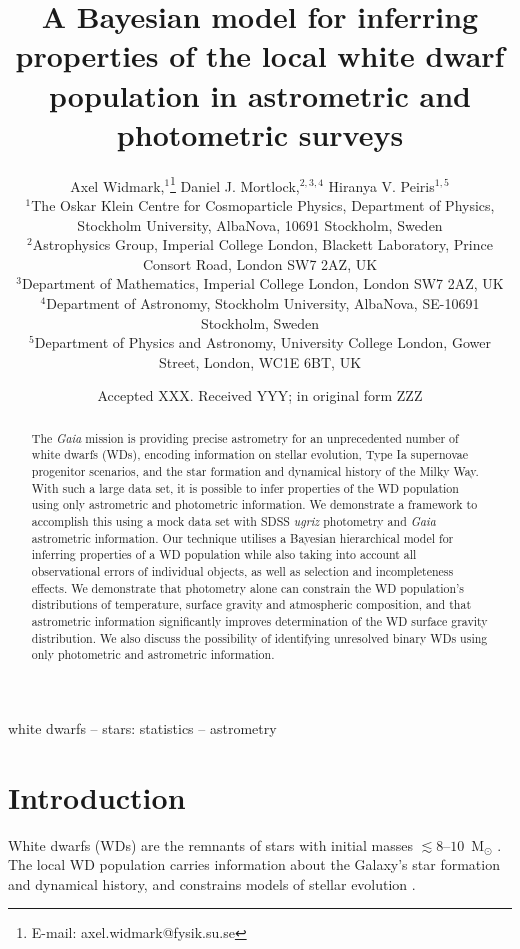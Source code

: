 \documentclass[fleqn,usenatbib]{mnras}
\title[Inferring properties of the white dwarf population]{A Bayesian model for inferring properties of the local white dwarf population in astrometric and photometric surveys}
\author[A. Widmark et al.]{
Axel Widmark,$^1$\thanks{E-mail: axel.widmark@fysik.su.se} 
Daniel J. Mortlock,$^{2,3,4}$
Hiranya V. Peiris$^{1,5}$
\\
$^1$The Oskar Klein Centre for Cosmoparticle Physics, Department of
Physics, Stockholm University, AlbaNova, 10691 Stockholm, Sweden\\
$^2$Astrophysics Group, Imperial College London, Blackett Laboratory, Prince Consort Road, London SW7 2AZ, UK\\
$^3$Department of Mathematics, Imperial College London, London SW7 2AZ, UK\\
$^4$Department of Astronomy, Stockholm University, AlbaNova, SE-10691 Stockholm, Sweden\\
$^5$Department of Physics and Astronomy, University College London, Gower Street, London, WC1E 6BT, UK\\
}
\date{Accepted XXX. Received YYY; in original form ZZZ}
\begin{document}
\label{firstpage}
\pagerange{\pageref{firstpage}--\pageref{lastpage}}
\maketitle

\begin{abstract}
The \emph{Gaia} mission is providing precise astrometry for an unprecedented number of white dwarfs (WDs), encoding information on stellar evolution, Type Ia supernovae progenitor scenarios, and the star formation and dynamical history of the Milky Way. With such a large data set, it is possible to infer properties of the WD population using only astrometric and photometric information. We demonstrate a framework to accomplish this using a mock data set with SDSS \emph{ugriz} photometry and \emph{Gaia} astrometric information.
Our technique utilises a Bayesian hierarchical model for inferring properties of a WD population while also taking into account all observational errors of individual objects, as well as selection and incompleteness effects.
We demonstrate that photometry alone can constrain the WD population's  distributions of temperature, surface gravity and atmospheric composition, and that astrometric information significantly improves determination of the WD surface gravity distribution. We also discuss the possibility of identifying unresolved binary WDs using only photometric and astrometric information.
\end{abstract}

\begin{keywords}
white dwarfs -- stars: statistics -- astrometry
\end{keywords}









\section{Introduction}

White dwarfs (WDs) are the remnants of stars with initial masses $\lesssim8\mbox{--}10$~M$_\odot$ \citep{1996ApJ...460..489R,2009MNRAS.395.1409S}. The local WD population carries information about the Galaxy's star formation and dynamical history, and constrains models of stellar evolution \citep{1987ApJ...315L..77W,2016NewAR..72....1G,2018arXiv180505849E}.
\end{document}
